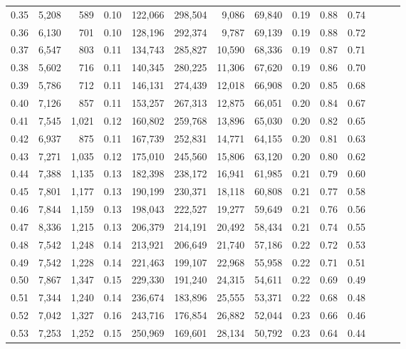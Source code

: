 \begin{tabular}{rrrrrrrrrrrrrr}
0.35 &  5,208 &    589 &  0.10 &  122,066 &  298,504 &   9,086 &  69,840 &  0.19 &  0.88 &      0.74 \\
0.36 &  6,130 &    701 &  0.10 &  128,196 &  292,374 &   9,787 &  69,139 &  0.19 &  0.88 &      0.72 \\
0.37 &  6,547 &    803 &  0.11 &  134,743 &  285,827 &  10,590 &  68,336 &  0.19 &  0.87 &      0.71 \\
0.38 &  5,602 &    716 &  0.11 &  140,345 &  280,225 &  11,306 &  67,620 &  0.19 &  0.86 &      0.70 \\
0.39 &  5,786 &    712 &  0.11 &  146,131 &  274,439 &  12,018 &  66,908 &  0.20 &  0.85 &      0.68 \\
0.40 &  7,126 &    857 &  0.11 &  153,257 &  267,313 &  12,875 &  66,051 &  0.20 &  0.84 &      0.67 \\
0.41 &  7,545 &  1,021 &  0.12 &  160,802 &  259,768 &  13,896 &  65,030 &  0.20 &  0.82 &      0.65 \\
0.42 &  6,937 &    875 &  0.11 &  167,739 &  252,831 &  14,771 &  64,155 &  0.20 &  0.81 &      0.63 \\
0.43 &  7,271 &  1,035 &  0.12 &  175,010 &  245,560 &  15,806 &  63,120 &  0.20 &  0.80 &      0.62 \\
0.44 &  7,388 &  1,135 &  0.13 &  182,398 &  238,172 &  16,941 &  61,985 &  0.21 &  0.79 &      0.60 \\
0.45 &  7,801 &  1,177 &  0.13 &  190,199 &  230,371 &  18,118 &  60,808 &  0.21 &  0.77 &      0.58 \\
0.46 &  7,844 &  1,159 &  0.13 &  198,043 &  222,527 &  19,277 &  59,649 &  0.21 &  0.76 &      0.56 \\
0.47 &  8,336 &  1,215 &  0.13 &  206,379 &  214,191 &  20,492 &  58,434 &  0.21 &  0.74 &      0.55 \\
0.48 &  7,542 &  1,248 &  0.14 &  213,921 &  206,649 &  21,740 &  57,186 &  0.22 &  0.72 &      0.53 \\
0.49 &  7,542 &  1,228 &  0.14 &  221,463 &  199,107 &  22,968 &  55,958 &  0.22 &  0.71 &      0.51 \\
0.50 &  7,867 &  1,347 &  0.15 &  229,330 &  191,240 &  24,315 &  54,611 &  0.22 &  0.69 &      0.49 \\
0.51 &  7,344 &  1,240 &  0.14 &  236,674 &  183,896 &  25,555 &  53,371 &  0.22 &  0.68 &      0.48 \\
0.52 &  7,042 &  1,327 &  0.16 &  243,716 &  176,854 &  26,882 &  52,044 &  0.23 &  0.66 &      0.46 \\
0.53 &  7,253 &  1,252 &  0.15 &  250,969 &  169,601 &  28,134 &  50,792 &  0.23 &  0.64 &      0.44 \\

\end{tabular}
